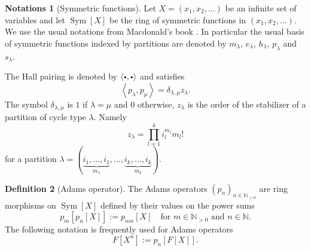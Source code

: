 \documentclass[JEP,XML,SOM,NoEqCountersInSection,Unicode,published]{cedram}
\newcommand{\sbullet}{{\scriptscriptstyle\bullet}}
\newcommand{\csbullet}{{\raisebox{1pt}{$\sbullet$}}}
\theoremstyle{definition}
\newtheorem{definition}{Definition}[section]
\newtheorem{notations}[definition]{Notations}
\theoremstyle{plain}
\DeclareMathOperator{\SymF}{Sym}
\newcommand{\NN}{\mathbb N}
\begin{document}
\begin{notations}[Symmetric functions]
Let $X=(x_1,x_2,\dots)$ be an infinite set of variables and let $\SymF[X]$ be the ring of symmetric functions in $(x_1,x_2,\dots)$. We use the usual notations from Macdonald's book \cite{Macdonald}. In particular the usual basis of symmetric functions indexed by partitions are denoted by $m_{\lambda}$, $e_{\lambda}$, $h_{\lambda}$, $p_{\lambda}$ and $s_{\lambda}$.

The Hall pairing is denoted by $\langle\csbullet,\csbullet\rangle$ and satisfies
\begin{equation}\label{orthp}
\left\langle p_\lambda,p_\mu\right\rangle =\delta_{\lambda,\mu}z_\lambda.
\end{equation}
The symbol $\delta_{\lambda,\mu}$ is $1$ if $\lambda=\mu$ and $0$ otherwise, $z_\lambda$ is the order of the stabilizer of a partition of cycle type $\lambda$. Namely
\begin{equation*}
z_\lambda=\prod_{l=1}^k i_l^{m_{l}}m_{l}!
\end{equation*}
for a partition $\lambda=(\underbrace{i_1,\dots,i_1}_{m_{1}},\dots,\underbrace{i_k,\dots,i_k}_{m_{k}})$.
\end{notations}

\begin{definition}[Adams operator]
The Adams operators $(p_n)_{n\in\mathbb{N}_{>0}}$ are ring morphisms on $\SymF[X]$ defined by their values on the power sums
\[
p_m\left[p_n[X]\right]:=p_{mn}[X]\quad\text{for } m \in \NN_{>0} \text{ and } n \in \NN.
\]
The following notation is frequently used for Adams operators
\[
F\left[X^n\right]:=p_n\left[F[X]\right].
\]
\end{definition}
\end{document}

